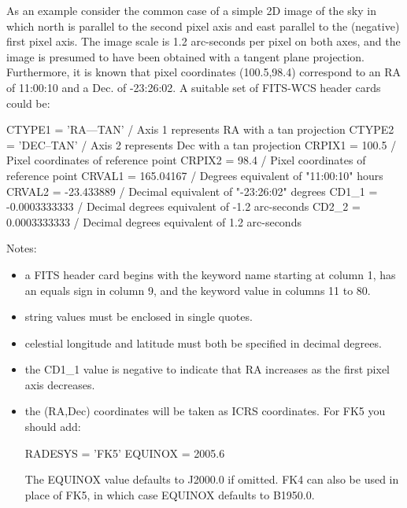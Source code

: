 \documentclass[twoside,11pt]{starlink}
\begin{document}
As an example consider the common case of a simple 2D image of the sky in
which north is parallel to the second pixel axis and east parallel to the
(negative) first pixel axis. The image scale is 1.2 arc-seconds per pixel
on both axes, and the image is presumed to have been obtained with a
tangent plane projection. Furthermore, it is known that pixel coordinates
(100.5,98.4) correspond to an RA of 11:00:10 and a Dec. of  -23:26:02.
A suitable set of FITS-WCS header cards could be:

\begin{small}
\begin{terminalv}
CTYPE1  = 'RA---TAN'       / Axis 1 represents RA with a tan projection
CTYPE2  = 'DEC--TAN'       / Axis 2 represents Dec with a tan projection
CRPIX1  = 100.5            / Pixel coordinates of reference point
CRPIX2  = 98.4             / Pixel coordinates of reference point
CRVAL1  = 165.04167        / Degrees equivalent of "11:00:10" hours
CRVAL2  = -23.433889       / Decimal equivalent of "-23:26:02" degrees
CD1_1   = -0.0003333333    / Decimal degrees equivalent of -1.2 arc-seconds
CD2_2   = 0.0003333333     / Decimal degrees equivalent of 1.2 arc-seconds
\end{terminalv}
\end{small}

Notes:
\begin{itemize}
\item a FITS header card begins with the keyword name starting at column 1,
has an equals sign in column 9, and the keyword value in columns 11 to 80.
\item string values must be enclosed in single quotes.
\item celestial longitude and latitude must both be specified in decimal degrees.
\item the CD1\_1 value is negative to indicate that RA increases as the
first pixel axis decreases.
\item the (RA,Dec) coordinates will be taken as ICRS coordinates. For FK5
you should add:

\begin{small}
\begin{terminalv}
RADESYS = 'FK5'
EQUINOX = 2005.6
\end{terminalv}
\end{small}

The EQUINOX value defaults to J2000.0 if omitted. FK4 can also be used in
place of FK5, in which case EQUINOX defaults to B1950.0.

\end{itemize}
\end{document}
